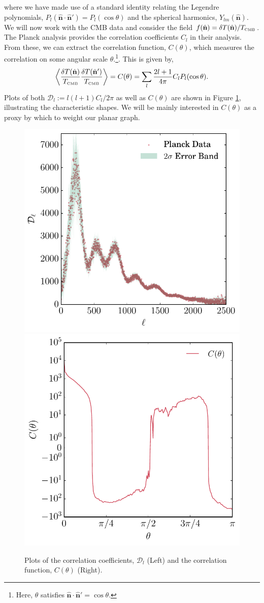 \documentclass[11pt]{article}
\numberwithin{equation}{section}
\numberwithin{figure}{section}
\numberwithin{table}{section}
\numberwithin{definition}{section}
\begin{document}
where we have made use of a standard identity relating the Legendre polynomials, $P_l(\hat{\mathbf{n}}\cdot\hat{\mathbf{n}}') = P_l(\cos\theta)$ and the spherical harmonics, $Y_{lm}(\hat{\mathbf{n}})$. We will now work with the CMB data and consider the field $f(\hat{\mathbf{n}}) = \delta T(\hat{\mathbf{n}})/T_{\textrm{\tiny CMB}}$. The Planck analysis \citep{Aghanim:2018eyx} provides the correlation coefficients $C_l$ in their analysis. From these, we can extract the correlation function, $C(\theta)$, which measures the correlation on some angular scale $\theta$.\footnote{Here, $\theta$ satisfies $\hat{\mathbf{n}}\cdot\hat{\mathbf{n}}' = \cos\theta$.}. This is given by,
\begin{equation}
\left< \frac{\delta T(\hat{\mathbf{n}})}{T_{\textrm{\tiny CMB}}} \frac{\delta T(\hat{\mathbf{n}}')}{T_{\textrm{\tiny CMB}}}\right> = C(\theta) = \sum_{l}{\frac{2l + 1}{4\pi}C_l P_l(\cos\theta)}.
\end{equation}
Plots of both $\mathcal{D}_l := l(l + 1)C_l/2\pi$ as well as $C(\theta)$ are shown in Figure \ref{fig:cmbspectrum}, illustrating the characteristic shapes. We will be mainly interested in $C(\theta)$ as a proxy by which to weight our planar graph.
\begin{figure}[t]
\begin{center}
\includegraphics[width=0.49\linewidth]{figures/TTspectrum.pdf} \hfill
\includegraphics[width=0.49\linewidth]{figures/correlation.pdf}
\caption{Plots of the correlation coefficients, $\mathcal{D}_l$ (Left) and the correlation function, $C(\theta)$ (Right).}\label{fig:cmbspectrum}
\end{center}
\end{figure}
\end{document}

